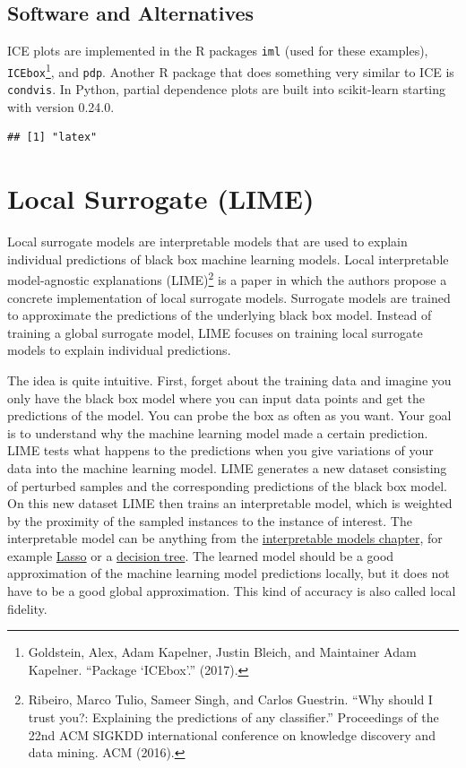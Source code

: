 \documentclass[
  11pt,
]{scrbook}
\begin{document}
\hypertarget{software-and-alternatives-2}{%
\subsection{Software and Alternatives}\label{software-and-alternatives-2}}

ICE plots are implemented in the R packages \texttt{iml} (used for these examples), \texttt{ICEbox}\footnote{Goldstein, Alex, Adam Kapelner, Justin Bleich, and Maintainer Adam Kapelner. ``Package `ICEbox'.'' (2017).}, and \texttt{pdp}.
Another R package that does something very similar to ICE is \texttt{condvis}. In Python, partial dependence plots are built into scikit-learn starting with version 0.24.0.

\begin{verbatim}
## [1] "latex"
\end{verbatim}

\newpage

\hypertarget{lime}{%
\section{Local Surrogate (LIME)}\label{lime}}

Local surrogate models are interpretable models that are used to explain individual predictions of black box machine learning models.
Local interpretable model-agnostic explanations (LIME)\footnote{Ribeiro, Marco Tulio, Sameer Singh, and Carlos Guestrin. ``Why should I trust you?: Explaining the predictions of any classifier.'' Proceedings of the 22nd ACM SIGKDD international conference on knowledge discovery and data mining. ACM (2016).} is a paper in which the authors propose a concrete implementation of local surrogate models.
Surrogate models are trained to approximate the predictions of the underlying black box model.
Instead of training a global surrogate model, LIME focuses on training local surrogate models to explain individual predictions.

The idea is quite intuitive.
First, forget about the training data and imagine you only have the black box model where you can input data points and get the predictions of the model.
You can probe the box as often as you want.
Your goal is to understand why the machine learning model made a certain prediction.
LIME tests what happens to the predictions when you give variations of your data into the machine learning model.
LIME generates a new dataset consisting of perturbed samples and the corresponding predictions of the black box model.
On this new dataset LIME then trains an interpretable model, which is weighted by the proximity of the sampled instances to the instance of interest.
The interpretable model can be anything from the \protect\hyperlink{simple}{interpretable models chapter}, for example \protect\hyperlink{lasso}{Lasso} or a \protect\hyperlink{tree}{decision tree}.
The learned model should be a good approximation of the machine learning model predictions locally, but it does not have to be a good global approximation.
This kind of accuracy is also called local fidelity.
\end{document}
